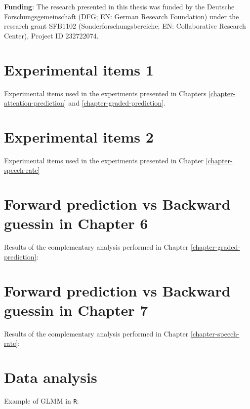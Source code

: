 \documentclass[a4paper, nobind]{templates/ociamthesis}
\begin{document}
\textbf{Funding}: The research presented in this thesis was funded by the Deutsche Forschungsgemeinschaft (DFG; EN: German Research Foundation) under the research grant SFB1102 (Sonderforschungsbereiche; EN: Collaborative Research Center), Project ID 232722074.

\startappendices

\hypertarget{experimental-items-1}{%
\chapter{Experimental items 1}\label{experimental-items-1}}

Experimental items used in the experiments presented in Chapters \ref{chapter-attention-prediction} and \ref{chapter-graded-prediction}.

\hypertarget{experimental-items-2}{%
\chapter{Experimental items 2}\label{experimental-items-2}}

Experimental items used in the experiments presented in Chapter \ref{chapter-speech-rate}

\hypertarget{forward-prediction-vs-backward-guessin-in-chapter-6}{%
\chapter{Forward prediction vs Backward guessin in Chapter 6}\label{forward-prediction-vs-backward-guessin-in-chapter-6}}

Results of the complementary analysis performed in Chapter \ref{chapter-graded-prediction}:

\hypertarget{forward-prediction-vs-backward-guessin-in-chapter-7}{%
\chapter{Forward prediction vs Backward guessin in Chapter 7}\label{forward-prediction-vs-backward-guessin-in-chapter-7}}

Results of the complementary analysis performed in Chapter \ref{chapter-speech-rate}:

\hypertarget{data-analysis}{%
\chapter{Data analysis}\label{data-analysis}}

Example of GLMM in \texttt{R}:
\end{document}
